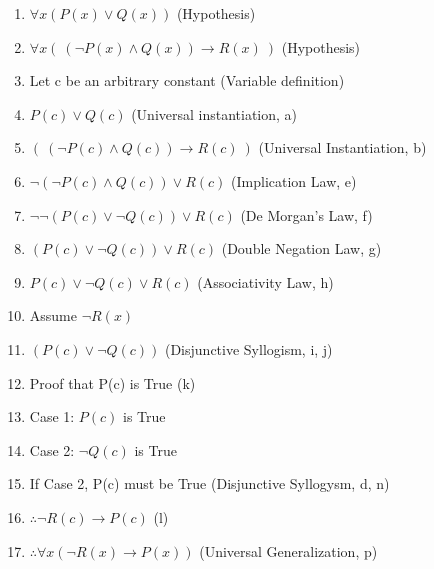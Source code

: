 \documentclass[12pt, oneside]{article}
\begin{document}
\begin{enumerate}
\begin{enumerate}
    \item $\forall x (P(x) \lor Q(x))$ (Hypothesis)
    \item $\forall x (~(\neg P(x)\land Q(x)) \to R(x)~)$ (Hypothesis)
    \item Let c be an arbitrary constant (Variable definition)
    \item $P(c) \lor Q(c)$ (Universal instantiation, a)
    \item $(~(\neg P(c)\land Q(c)) \to R(c)~)$ (Universal Instantiation, b)
    \item $\neg (\neg P(c)\land Q(c)) \lor R(c)$ (Implication Law, e) 
    \item $\neg \neg (P(c) \lor \neg Q(c)) \lor R(c)$ (De Morgan's Law, f)
    \item $(P(c) \lor \neg Q(c)) \lor R(c)$ (Double Negation Law, g)
    \item $P(c) \lor \neg Q(c) \lor R(c)$ (Associativity Law, h)
    \item Assume $\neg R(x)$
    \item $(P(c) \lor \neg Q(c))$ (Disjunctive Syllogism, i, j)
    \item Proof that P(c) is True (k)
    \item Case 1: $P(c)$ is True
    \item Case 2: $\neg Q(c)$ is True
    \item If Case 2, P(c) must be True (Disjunctive Syllogysm, d, n)
    \item $\therefore \neg R(c) \to P(c)$ (l)
    \item $\therefore \forall x (\neg R(x) \to P(x))$ (Universal Generalization, p)
\end{enumerate}


\end{enumerate}
\end{document}
